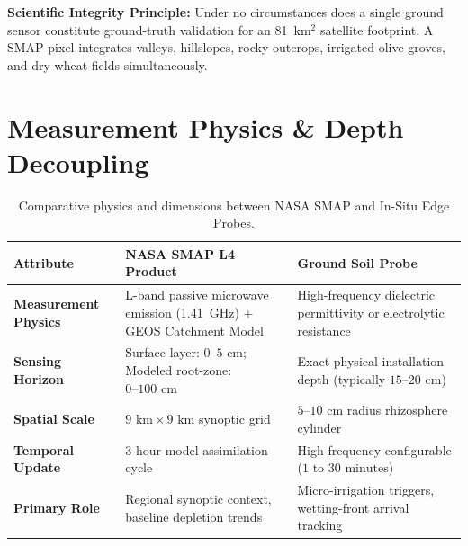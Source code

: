 \documentclass[11pt,a4paper,oneside]{report}
\begin{document}
\begin{warningbox}
\textbf{Scientific Integrity Principle:} Under no circumstances does a single ground sensor constitute ground-truth validation for an 81~km$^2$ satellite footprint. A SMAP pixel integrates valleys, hillslopes, rocky outcrops, irrigated olive groves, and dry wheat fields simultaneously.
\end{warningbox}

\section{Measurement Physics \& Depth Decoupling}
\begin{table}[h!]
\centering
\small
\begin{tabularx}{\linewidth}{lXX}
\toprule
\textbf{Attribute} & \textbf{NASA SMAP L4 Product} & \textbf{Ground Soil Probe} \\
\midrule
\textbf{Measurement Physics} & L-band passive microwave emission (1.41~GHz) + GEOS Catchment Model & High-frequency dielectric permittivity or electrolytic resistance \\
\textbf{Sensing Horizon} & Surface layer: $0–5\text{ cm}$; Modeled root-zone: $0–100\text{ cm}$ & Exact physical installation depth (typically $15–20\text{ cm}$) \\
\textbf{Spatial Scale} & $9\text{ km} \times 9\text{ km}$ synoptic grid & $5–10\text{ cm}$ radius rhizosphere cylinder \\
\textbf{Temporal Update} & 3-hour model assimilation cycle & High-frequency configurable ($1\text{ to }30\text{ minutes}$) \\
\textbf{Primary Role} & Regional synoptic context, baseline depletion trends & Micro-irrigation triggers, wetting-front arrival tracking \\
\bottomrule
\end{tabularx}
\caption{Comparative physics and dimensions between NASA SMAP and In-Situ Edge Probes.}
\end{table}
\end{document}
